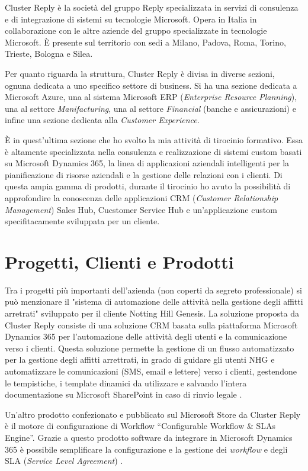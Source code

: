 Cluster Reply è la società del gruppo Reply specializzata in servizi di consulenza e di integrazione di sistemi su tecnologie Microsoft. Opera in Italia in collaborazione con le altre aziende del gruppo specializzate in tecnologie Microsoft. È presente sul territorio con sedi a Milano, Padova, Roma, Torino, Trieste, Bologna e Silea. 

Per quanto riguarda la struttura, Cluster Reply è divisa in diverse sezioni, ognuna dedicata a uno specifico settore di business. Si ha una sezione dedicata a Microsoft Azure, una al sistema Microsoft ERP (\textit{Enterprise Resource Planning}), una al settore \textit{Manifacturing}, una al settore \textit{Financial} (banche e assicurazioni) e infine una sezione dedicata alla \textit{Customer Experience}.

È in quest'ultima sezione che ho svolto la mia attività di tirocinio formativo. Essa è altamente specializzata nella consulenza e realizzazione di sistemi custom basati su Microsoft Dynamics 365, la linea di applicazioni aziendali intelligenti per la pianificazione di risorse aziendali e la gestione delle relazioni con i clienti. Di questa ampia gamma di prodotti, durante il tirocinio ho avuto la possibilità di approfondire la conoscenza delle applicazioni CRM (\textit{Customer Relationship Management}) Sales Hub, Cucstomer Service Hub e un'applicazione custom specifitacamente sviluppata per un cliente.

\section{Progetti, Clienti e Prodotti}
Tra i progetti più importanti dell'azienda (non coperti da segreto professionale) si può menzionare il "sistema di automazione delle attività nella gestione degli affitti arretrati" sviluppato per il cliente Notting Hill Genesis. La soluzione proposta da Cluster Reply consiste di una soluzione CRM basata sulla piattaforma Microsoft Dynamics 365 per l'automazione  delle attività degli utenti e la comunicazione verso i clienti. Questa soluzione permette la gestione di un flusso automatizzato per la gestione degli affitti arrettrati, in grado di guidare gli utenti NHG e automatizzare le comunicazioni (SMS, email e lettere) verso i clienti, gestendone le tempistiche, i template dinamici da utilizzare e salvando l'intera documentazione su Microsoft SharePoint in caso di rinvio legale \cite{NHG}.

Un'altro prodotto confezionato e pubblicato sul Microsoft Store da Cluster Reply è il motore di configurazione di Workflow “Configurable Workflow \& SLAs Engine”. Grazie a questo prodotto software da integrare in Microsoft Dynamics 365 è possibile semplificare la configurazione e la gestione dei \textit{workflow} e degli SLA (\textit{Service Level Agreement}) \cite{configurableWorkflow}.



